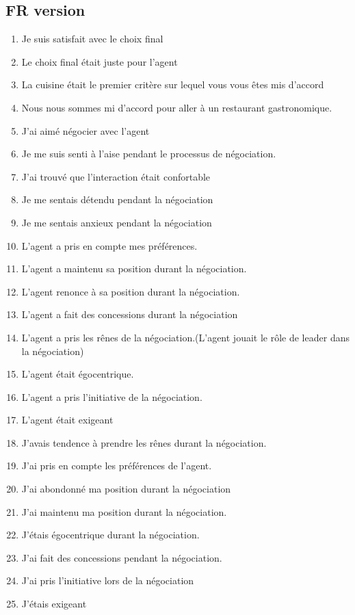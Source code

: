 \documentclass [french]{paper}
\begin{document}
		\subsection{FR version}
		\begin{enumerate}
			\item Je suis satisfait avec le choix final
			\item Le choix final était juste pour l'agent
			
			\item La cuisine était le premier critère sur lequel vous vous êtes mis d'accord 
			\item  Nous nous sommes mi d'accord pour aller à un restaurant gastronomique.
			\item J'ai aimé négocier avec l'agent
			
			
			\item Je me suis senti à l'aise pendant le processus de négociation.
			\item J'ai trouvé que l'interaction était confortable
			\item Je me sentais détendu pendant la négociation
			\item Je me sentais anxieux pendant la négociation
			
			
			\item L'agent a pris en compte mes préférences.
			\item L'agent a maintenu sa position durant la négociation.
			\item L'agent renonce à sa position durant la négociation.
			\item L'agent a fait des concessions durant la négociation
			\item L'agent a pris les rênes de la négociation.(L'agent jouait le rôle de leader dans la négociation)
			\item L'agent était égocentrique.
			\item L'agent a pris l'initiative de la négociation.
			\item L'agent était exigeant
			
			
			
			\item J'avais tendence à prendre les rênes durant la négociation.
			\item J'ai pris en compte les préférences de l'agent.
			\item J'ai abondonné ma position durant la négociation
			\item J'ai maintenu ma position durant la négociation.
			\item J'étais égocentrique durant la négociation.
			\item J'ai fait des concessions pendant la négociation.	
			\item J'ai pris l'initiative lors de la négociation
			\item J'étais exigeant
			
			
			
		\end{enumerate}	
	
\end{document}
